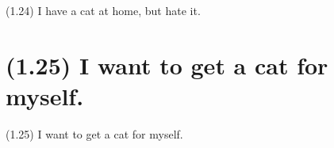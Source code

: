 \documentclass{article}
\begin{document}
\bigbreak
\begin{enumerate*}
\item[(1.24)] I have a cat at home, but hate it.
\end{enumerate*}
\bigbreak

\bigbreak
\begin{minipage}{\textwidth}
\end{minipage}
\bigbreak

\clearpage

%
%

\section*{(1.25) I want to get a cat for myself.}

\bigbreak
\begin{enumerate*}
\item[(1.25)] I want to get a cat for myself.
\end{enumerate*}
\bigbreak

\bigbreak
\begin{minipage}{\textwidth}
\end{minipage}
\bigbreak
\end{document}
